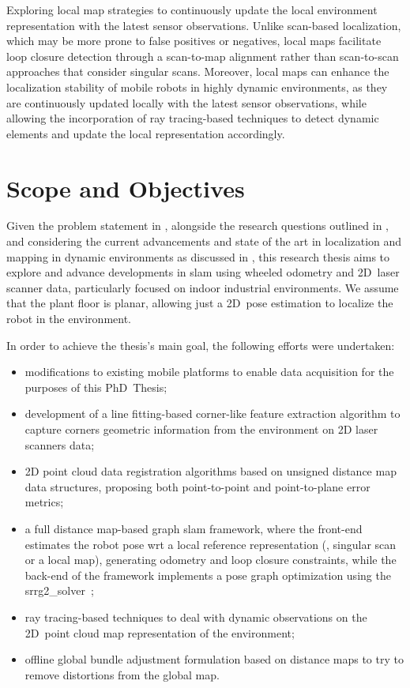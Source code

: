 \begin{hypothesis}\label{hypothesis:localization:local-maps}
Exploring local map strategies to continuously update the local environment
representation with the latest sensor observations. Unlike scan-based
localization, which may be more prone to false positives or negatives,
local maps facilitate loop closure detection through a scan-to-map alignment
rather than scan-to-scan approaches that consider singular scans.
Moreover, local maps can enhance the localization stability of mobile robots in
highly dynamic environments, as they are continuously updated locally with the
latest sensor observations, while allowing the incorporation of
ray tracing-based techniques to detect dynamic elements and update the local
representation accordingly.
\end{hypothesis}

\section{Scope and Objectives}\label{sec:intro:scope}

Given the problem statement in ,
alongside the research questions outlined in ,
and considering the current advancements and state of the art in localization
and mapping in dynamic environments as discussed in ,
this research thesis aims to explore and advance developments in \gls{slam}
using wheeled odometry and 2D~laser scanner data,
particularly focused on indoor industrial environments.
We assume that the plant floor is planar,
allowing just a 2D~pose estimation to localize the robot in the environment.

In order to achieve the thesis's main goal,
the following efforts were undertaken:
\begin{itemize}
\item modifications to existing mobile platforms to enable data acquisition
for the purposes of this PhD~Thesis;
\item development of a line fitting-based corner-like feature extraction
algorithm to capture corners geometric information from the environment on
2D laser scanners data;
\item 2D point cloud data registration algorithms
based on unsigned distance map data structures,
proposing both point-to-point and point-to-plane error metrics;
\item a full distance map-based graph \gls{slam} framework,
where the front-end estimates the robot pose \gls{wrt} a local
reference representation (\eg, singular scan or a local map),
generating odometry and loop closure constraints,
while the back-end of the framework implements a pose graph optimization
using the srrg2\_solver~\cite{grisetti:robotics:2020};
\item ray tracing-based techniques to deal with dynamic observations
on the 2D~point cloud map representation of the environment;
\item offline global bundle adjustment formulation based on distance maps
to try to remove distortions from the global map.
\end{itemize}

